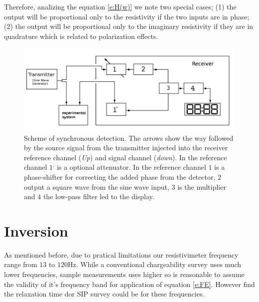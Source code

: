 \documentclass{vie16}
\begin{document}
Therefore, analizing the equation \ref{e:H(w)} we note two
special cases; (1) the output will be proportional only to the
resistivity if the two inputs are in phase; (2) the output will be
proportional only to the imaginary resistivity if they are in
quadrature which is related to polarization effects. %

\begin{figure}[h!]
	\centering
	\includegraphics[keepaspectratio=true,scale=0.3]{Sistema-Inside_Lock_In}
	\caption{Scheme of synchronous detection. The arrows show the way followed by the source signal from the transmitter injected into the receiver reference channel (\textit{Up}) and signal channel (\textit{down}). In the reference channel $1^{,}$ is a optional attenuator. In the reference channel $1$ is a phase-shifter for correcting the added phase from the detector, $2$ output a square wave from the sine wave input, $3$ is the multiplier and  $4$ the low-pass filter led to the display. }
	\label{f:Lock-in}
\end{figure}





\section{Inversion}

As mentioned before, due to pratical limitations our resistivimeter frequency range from $13$ to $120$Hz.
While a conventional chargeability survey uses much lower frequencies, sample measurements uses higher %
so is reasonable to assume the validity of it's frequency band for application of equation \ref{e:FE}. However
find the relaxation time dor SIP survey could be %
for these frequencies.
\end{document}
